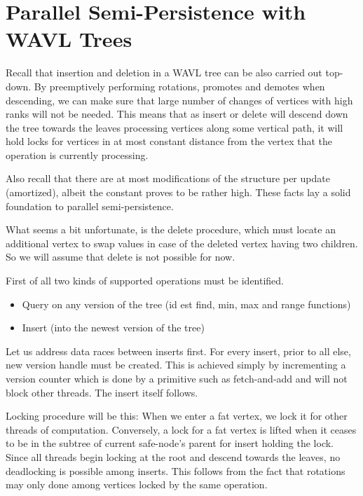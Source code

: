 \section{Parallel Semi-Persistence with WAVL Trees}

Recall that insertion and deletion in a WAVL tree can be also carried out top-down.
By preemptively performing rotations, promotes and demotes when descending, we can make sure that large number of changes of vertices with high ranks will not be needed. This means that as insert or delete will descend down the tree towards the leaves processing vertices along some vertical path, it will hold locks for vertices in at most constant distance from the vertex that the operation is currently processing.

Also recall that there are at most  modifications of the structure per update (amortized), albeit the constant proves to be rather high. These facts lay a solid foundation to parallel semi-persistence.

What seems a bit unfortunate, is the delete procedure, which must locate an additional vertex to swap values in case of the deleted vertex having two children. So we will assume that delete is not possible for now.

First of all two kinds of supported operations must be identified. 

\begin{itemize}
	\item Query on any version of the tree (id est find, min, max and range functions)
	\item Insert (into the newest version of the tree)
\end{itemize}

Let us address data races between inserts first. For every insert, prior to all else, new version handle must be created. This is achieved simply by incrementing a version counter which is done by a primitive such as fetch-and-add and will not block other threads. The insert itself follows.

Locking procedure will be this: When we enter a fat vertex, we lock it for other threads of computation. Conversely, a lock for a fat vertex is lifted when it ceases to be in the subtree of current safe-node's parent for insert holding the lock. Since all threads begin locking at the root and descend towards the leaves, no deadlocking is possible among inserts. This follows from the fact that rotations may only done among vertices locked by the same operation.

